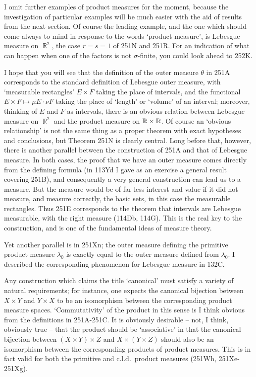 {I omit further examples of product measures for the
moment, because the investigation of particular examples will be much
easier with the aid of results from the next section.   Of course the
leading example, and the one which should come always to mind in
response to the words `product measure', is Lebesgue measure on
$\BbbR^2$, the case $r=s=1$ of 251N and 251R.   For an indication of
what can happen when
one of the factors is not $\sigma$-finite, you could look ahead to 252K.

I hope that you will see that the definition of the outer measure
$\theta$ in 251A corresponds to the standard definition of Lebesgue
outer measure, with `measurable rectangles' $E\times F$ taking the
place of intervals, and the functional $E\times F\mapsto\mu E\cdot\nu F$
taking the place of `length' or `volume' of an interval;
moreover, thinking of $E$ and $F$ as intervals, there is an obvious
relation between Lebesgue measure on $\BbbR^2$ and the product measure
on $\Bbb R\times\Bbb R$.   Of course an `obvious relationship' is not
the same thing as a proper theorem with exact hypotheses and
conclusions, but Theorem 251N is clearly central.   Long before that,
however, there is another parallel between the construction of 251A and
that of Lebesgue measure.   In both cases, the proof that we have an
outer measure comes directly from the defining formula (in 113Yd I gave
as an exercise a general result covering 251B), and consequently a very
general construction can lead us to a measure.   But the measure would
be of far less interest and value if it did not measure, and measure
correctly, the basic sets, in this case the measurable rectangles.
Thus 251E corresponds to the theorem that intervals are Lebesgue
measurable, with the right measure (114Db, 114G).   This is the real key
to the construction, and is one of the fundamental ideas of measure
theory.

Yet another parallel is in 251Xn;  the outer measure defining the
primitive product measure $\lambda_0$ is exactly equal to the outer
measure defined from $\lambda_0$.   I described the corresponding
phenomenon for Lebesgue measure in 132C.

Any construction which claims the title `canonical' must
satisfy a variety of natural requirements;  for instance, one expects
the canonical bijection between $X\times Y$ and $Y\times X$ to be an
isomorphism between the corresponding product measure spaces.
`Commutativity' of the product in this sense is I think obvious from
the definitions in 251A-251C.   It is obviously desirable -- not, I
think, obviously true -- that the product should be `associative' in
that the canonical bijection between $(X\times Y)\times Z$ and
$X\times(Y\times Z)$ should also be an isomorphism between the
corresponding products of product measures.   This is in fact valid for
both the primitive and c.l.d.\ product measures (251Wh, 251Xe-251Xg).

}
